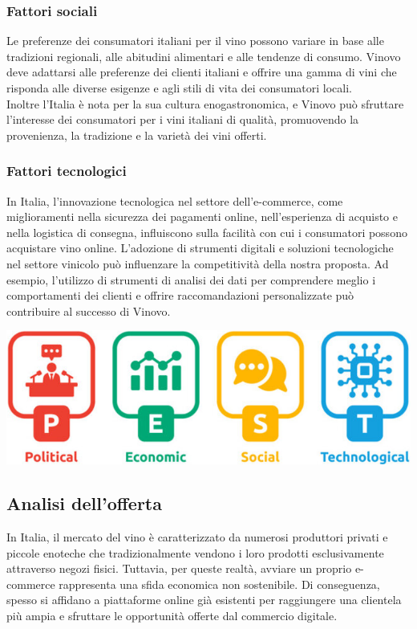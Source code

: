 \documentclass[12pt, a4paper]{article}
\begin{document}
\subsubsection*{Fattori sociali}
Le preferenze dei consumatori italiani per il vino possono variare in base alle tradizioni regionali, alle abitudini alimentari e alle tendenze di consumo. Vinovo deve adattarsi alle preferenze dei clienti italiani e offrire una gamma di vini che risponda alle diverse esigenze e agli stili di vita dei consumatori locali.\\
Inoltre l'Italia è nota per la sua cultura enogastronomica, e Vinovo può sfruttare l'interesse dei consumatori per i vini italiani di qualità, promuovendo la provenienza, la tradizione e la varietà dei vini offerti.

\subsubsection*{Fattori tecnologici}
In Italia, l'innovazione tecnologica nel settore dell'e-commerce, come miglioramenti nella sicurezza dei pagamenti online, nell'esperienza di acquisto e nella logistica di consegna, influiscono sulla facilità con cui i consumatori possono acquistare vino online.
L'adozione di strumenti digitali e soluzioni tecnologiche nel settore vinicolo può influenzare la competitività della nostra proposta. Ad esempio, l'utilizzo di strumenti di analisi dei dati per comprendere meglio i comportamenti dei clienti e offrire raccomandazioni personalizzate può contribuire al successo di Vinovo.\bigskip
\begin{center}
    \includegraphics[width=.6\textwidth]{images/pest-analisys.png}
\end{center}

\subsection{Analisi dell'offerta}
In Italia, il mercato del vino è caratterizzato da numerosi produttori privati e piccole enoteche che tradizionalmente vendono i loro prodotti esclusivamente attraverso negozi fisici. Tuttavia, per queste realtà, avviare un proprio e-commerce rappresenta una sfida economica non sostenibile. Di conseguenza, spesso si affidano a piattaforme online già esistenti per raggiungere una clientela più ampia e sfruttare le opportunità offerte dal commercio digitale.
\end{document}
